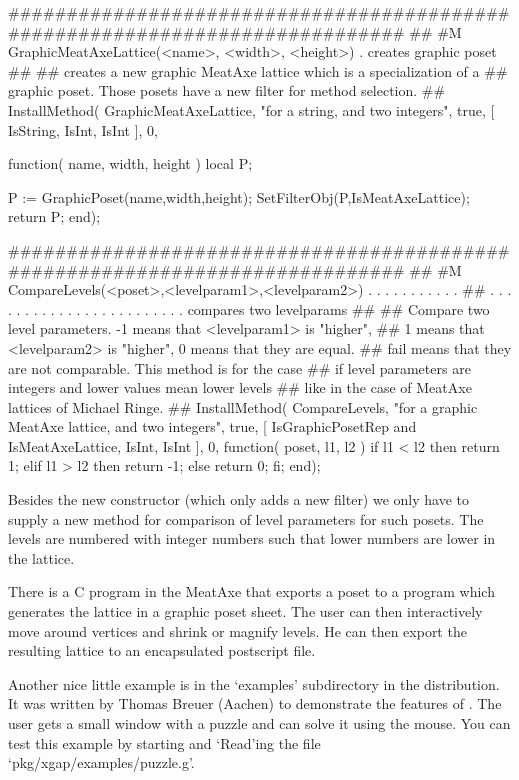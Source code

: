 #############################################################################
##
#M  GraphicMeatAxeLattice(<name>, <width>, <height>)  . creates graphic poset
##
##  creates a new graphic MeatAxe lattice which is a specialization of a
##  graphic poset. Those posets have a new filter for method selection.
##
InstallMethod( GraphicMeatAxeLattice,
    "for a string, and two integers",
    true,
    [ IsString,
      IsInt,
      IsInt ],
    0,

function( name, width, height )
  local P;

  P := GraphicPoset(name,width,height);
  SetFilterObj(P,IsMeatAxeLattice);
  return P;
end);

#############################################################################
##
#M  CompareLevels(<poset>,<levelparam1>,<levelparam2>)  . . . . . . . . . . .
##  . . . . . . . . . . . . . . . . . . . . . . . .  compares two levelparams
##
##  Compare two level parameters. -1 means that <levelparam1> is "higher", 
##  1 means that <levelparam2> is "higher", 0 means that they are equal. 
##  fail means that they are not comparable. This method is for the case 
##  if level parameters are integers and lower values mean lower levels 
##  like in the case of MeatAxe lattices of Michael Ringe.
##
InstallMethod( CompareLevels,
    "for a graphic MeatAxe lattice, and two integers",
    true,
    [ IsGraphicPosetRep and IsMeatAxeLattice, IsInt, IsInt ],
    0,
function( poset, l1, l2 )
  if l1 < l2 then
    return 1;
  elif l1 > l2 then
    return -1;
  else
    return 0;
  fi;
end);
\endexample

Besides the new constructor (which only adds a new filter) we only have to
supply a new method for comparison of level parameters for such posets. The 
levels are numbered with integer numbers such that lower numbers are lower
in the lattice.

There is a C program in the MeatAxe that exports a poset to a {\GAP}
program which generates the lattice in a graphic poset sheet. The user can
then interactively move around vertices and shrink or magnify levels. He
can then export the resulting lattice to an encapsulated postscript file.

Another nice little example is in the `examples' subdirectory in the
{\XGAP} distribution. It was written by Thomas Breuer (Aachen) to
demonstrate the features of {\XGAP}. The user gets a small window with a
puzzle and can solve it using the mouse. You can test this example by
starting {\XGAP} and `Read'ing the file `pkg/xgap/examples/puzzle.g'.

